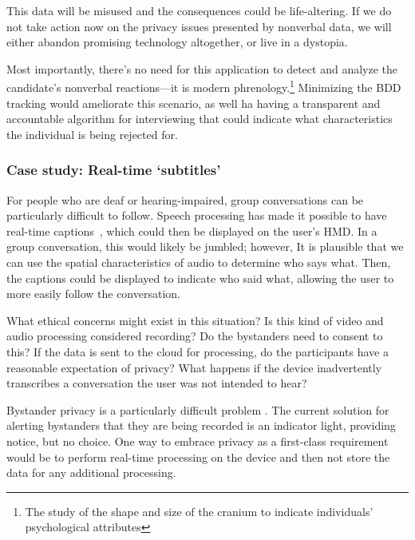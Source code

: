 This data will be misused and the consequences could be life-altering. If we do not take action now on the privacy issues presented by nonverbal data, we will either abandon promising technology altogether, or live in a dystopia.


Most importantly, there's no need for this application to detect and analyze the candidate's nonverbal reactions---it is modern phrenology.\footnote{The study of the shape and size of the cranium to indicate individuals' psychological attributes} Minimizing the BDD tracking would ameliorate this scenario, as well ha having a transparent and accountable algorithm for interviewing that could indicate what characteristics the individual is being rejected for.


\subsubsection{Case study: Real-time `subtitles'}

For people who are deaf or hearing-impaired, group conversations can be particularly difficult to follow. Speech processing has made it possible to have real-time captions~\cite{welch}, which could then be displayed on the user's HMD. In a group conversation, this would likely be jumbled; however, It is plausible that we can use the spatial characteristics of audio to determine who says what. Then, the captions could be displayed to indicate who said what, allowing the user to more easily follow the conversation.

What ethical concerns might exist in this situation? Is this kind of video and audio processing considered recording? Do the bystanders need to consent to this? If the data is sent to the cloud for processing, do the participants have a reasonable expectation of privacy? What happens if the device inadvertently transcribes a conversation the user was not intended to hear?

Bystander privacy is a particularly difficult problem \cite{perez}. The current solution for alerting bystanders that they are being recorded is an indicator light, providing notice, but no choice. One way to embrace privacy as a first-class requirement would be to perform real-time processing on the device and then not store the data for any additional processing. %

